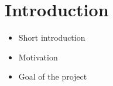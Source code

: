 \section{Introduction}
\label{sec:intro}

\begin{itemize}
    \item Short introduction 
    \item Motivation
    \item Goal of the project
\end{itemize}

\newpage